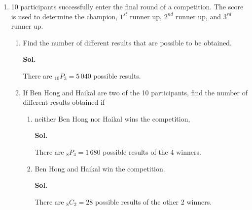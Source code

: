 \documentclass{report}
\newcommand\permtwo[2][^n]{{}_{#1}P_{#2}}
\newcommand\comb[2][^n]{{}_{#1}C_{#2}}
\newcommand{\sol}[1]{

      \noindent \textbf{Sol.}
}
\def\eos{\quad\hbox{\rlap{\hbox{\vrule depth 1.5pt height 2.6mm width 0.2mm \hskip 1mm \vrule height 2.6mm width 0.2mm}}{\vbox{\hrule height 0.2mm width 1.4mm \vskip 2.8mm \hrule depth 1.5pt height -0.35mm width 1.2mm}}}}
\begin{document}
\begin{multicols*}{2}
\begin{enumerate}
                  Find the number of different arrangements that can be done if
                  \begin{enumerate}
                        \item no condition is imposed, \sol{}

                              There are $8! = 40\,320$ ways to arrange the cards. $\eos$

                        \item the arrangements begin with R and ends with an even digit. \sol{}

                              There are 4 ways to choose the last card.

                              There are $6! = 720$ ways to arrange the remaining 6 cards.

                              Hence, there are $4 \times 720 = 2\,880$ ways to arrange the cards. $\eos$
                  \end{enumerate}

            \item 10 participants successfully enter the final round of a competition. The score is used to determine the champion, $1^{st}$ runner up, $2^{nd}$ runner up, and $3^{rd}$ runner up.
                  \begin{enumerate}
                        \item Find the number of different results that are possible to be obtained. \sol{}

                              There are $\permtwo[10]{3} = 5\,040$ possible results. $\eos$

                        \item If Ben Hong and Haikal are two of the 10 participants, find the number of
                              different results obtained if
                              \begin{enumerate}
                                    \item neither Ben Hong nor Haikal wins the competition, \sol{}

                                          There are $\permtwo[8]{4} = 1\,680$ possible results of the 4 winners. $\eos$

                                    \item Ben Hong and Haikal win the competition. \sol{}

                                          There are $\comb[8]{2} = 28$ possible results of the other 2 winners.


\end{enumerate}
\end{enumerate}
\end{enumerate}
\end{multicols*}
\end{document}
